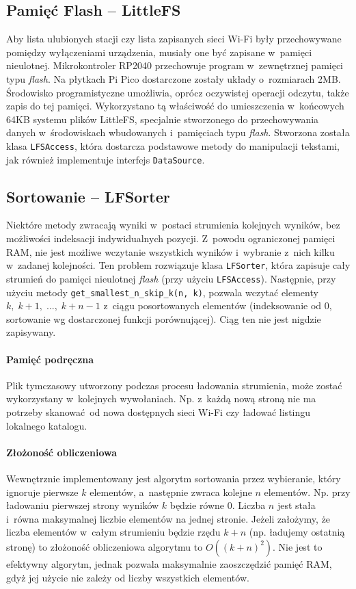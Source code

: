\documentclass[polish]{aghengthesis}
\begin{document}
		\subsection{Pamięć Flash -- LittleFS}
			Aby lista ulubionych stacji czy lista zapisanych sieci Wi-Fi były przechowywane pomiędzy wyłączeniami urządzenia, musiały one być zapisane w~pamięci nieulotnej. Mikrokontroler RP2040 przechowuje program w~zewnętrznej pamięci typu \textit{flash}. Na płytkach Pi Pico dostarczone zostały układy o~rozmiarach 2MB. Środowisko programistyczne umożliwia, oprócz oczywistej operacji odczytu, także zapis do tej pamięci. Wykorzystano tą właściwość do umieszczenia w~końcowych 64KB systemu plików LittleFS\textsuperscript{\cite{littlefs}}, specjalnie stworzonego do przechowywania danych w~środowiskach wbudowanych i~pamięciach typu \textit{flash}. Stworzona została klasa \lstinline|LFSAccess|, która dostarcza podstawowe metody do manipulacji tekstami, jak również implementuje interfejs \lstinline|DataSource|.
			
		\subsection{Sortowanie -- LFSorter}
			Niektóre metody zwracają wyniki w~postaci strumienia kolejnych wyników, bez możliwości indeksacji indywidualnych pozycji. Z~powodu ograniczonej pamięci RAM, nie jest możliwe wczytanie wszystkich wyników i~wybranie z~nich kilku w~zadanej kolejności. Ten problem rozwiązuje klasa \lstinline|LFSorter|, która zapisuje cały strumień do pamięci nieulotnej \textit{flash} (przy użyciu \lstinline|LFSAccess|). Następnie, przy użyciu metody \lstinline|get_smallest_n_skip_k(n, k)|, pozwala wczytać elementy $k,\; k+1,\; ...,\; k+n-1$ z~ciągu posortowanych elementów (indeksowanie od 0, sortowanie wg dostarczonej funkcji porównującej). Ciąg ten nie jest nigdzie zapisywany.
			
			\paragraph{Pamięć podręczna}
			Plik tymczasowy utworzony podczas procesu ładowania strumienia, może zostać wykorzystany w~kolejnych wywołaniach. Np. z~każdą nową stroną nie ma potrzeby skanować od nowa dostępnych sieci Wi-Fi czy ładować listingu lokalnego katalogu.
						
			\paragraph{Złożoność obliczeniowa}
			Wewnętrznie implementowany jest algorytm sortowania przez wybieranie, który ignoruje pierwsze $k$ elementów, a~następnie zwraca kolejne $n$ elementów. Np. przy ładowaniu pierwszej strony wyników $k$ będzie równe 0. Liczba $n$ jest stała i~równa maksymalnej liczbie elementów na jednej stronie. Jeżeli założymy, że liczba elementów w~całym strumieniu będzie rzędu $k+n$ (np. ładujemy ostatnią stronę) to złożoność obliczeniowa algorytmu to $O((k+n)^2)$. Nie jest to efektywny algorytm, jednak pozwala maksymalnie zaoszczędzić pamięć RAM, gdyż jej użycie nie zależy od liczby wszystkich elementów.
			
\end{document}
